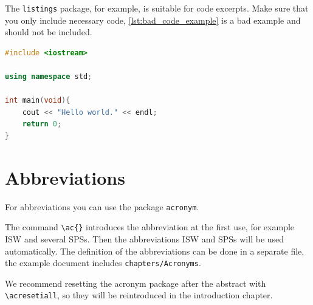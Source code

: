 The \texttt{listings} package, for example, is suitable for code excerpts.
Make sure that you only include necessary code, \autoref{lst:bad_code_example} is a bad example and should not be included.

\begin{lstlisting}[language=C++, caption={This code does not provide any insights and should not be included.}, label={lst:bad_code_example}]
#include <iostream>

using namespace std;

int main(void){
    cout << "Hello world." << endl;
    return 0;
}
\end{lstlisting}

\section{Abbreviations}

For abbreviations you can use the package \texttt{acronym}.

The command \texttt{\textbackslash ac\{\}} introduces the abbreviation at the first use, for example \ac{ISW} and several \acp{SPS}. Then the abbreviations \ac{ISW} and \acp{SPS} will be used automatically. The definition of the abbreviations can be done in a separate file, the example document includes \texttt{chapters/Acronyms}.

We recommend resetting the acronym package after the abstract with \texttt{\textbackslash acresetiall}, so they will be reintroduced in the introduction chapter.



\nocite{*}
